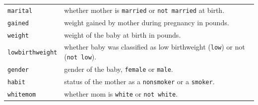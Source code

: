 \documentclass[]{book}
\theoremstyle{definition}
\theoremstyle{definition}
\theoremstyle{definition}
\theoremstyle{remark}
\begin{document}
\begin{longtable}[]{@{}ll@{}}
\begin{minipage}[t]{0.56\columnwidth}\raggedright
\texttt{marital}\strut
\end{minipage} & \begin{minipage}[t]{0.38\columnwidth}\raggedright
whether mother is \texttt{married} or \texttt{not\ married} at
birth.\strut
\end{minipage}\tabularnewline
\begin{minipage}[t]{0.56\columnwidth}\raggedright
\texttt{gained}\strut
\end{minipage} & \begin{minipage}[t]{0.38\columnwidth}\raggedright
weight gained by mother during pregnancy in pounds.\strut
\end{minipage}\tabularnewline
\begin{minipage}[t]{0.56\columnwidth}\raggedright
\texttt{weight}\strut
\end{minipage} & \begin{minipage}[t]{0.38\columnwidth}\raggedright
weight of the baby at birth in pounds.\strut
\end{minipage}\tabularnewline
\begin{minipage}[t]{0.56\columnwidth}\raggedright
\texttt{lowbirthweight}\strut
\end{minipage} & \begin{minipage}[t]{0.38\columnwidth}\raggedright
whether baby was classified as low birthweight (\texttt{low}) or not
(\texttt{not\ low}).\strut
\end{minipage}\tabularnewline
\begin{minipage}[t]{0.56\columnwidth}\raggedright
\texttt{gender}\strut
\end{minipage} & \begin{minipage}[t]{0.38\columnwidth}\raggedright
gender of the baby, \texttt{female} or \texttt{male}.\strut
\end{minipage}\tabularnewline
\begin{minipage}[t]{0.56\columnwidth}\raggedright
\texttt{habit}\strut
\end{minipage} & \begin{minipage}[t]{0.38\columnwidth}\raggedright
status of the mother as a \texttt{nonsmoker} or a \texttt{smoker}.\strut
\end{minipage}\tabularnewline
\begin{minipage}[t]{0.56\columnwidth}\raggedright
\texttt{whitemom}\strut
\end{minipage} & \begin{minipage}[t]{0.38\columnwidth}\raggedright
whether mom is \texttt{white} or \texttt{not\ white}.\strut
\end{minipage}\tabularnewline
\bottomrule
\end{longtable}
\end{document}
